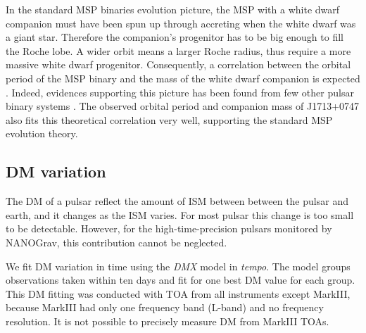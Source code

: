 In the standard MSP binaries evolution picture, the MSP with a white dwarf companion must have been spun up through
accreting when the white dwarf was a giant star. Therefore the 
companion's progenitor has to be big enough to fill the Roche lobe. A wider
orbit means a larger Roche radius, thus require a more massive white dwarf 
progenitor.
Consequently, a correlation between the orbital period
of the MSP binary and the mass of the white dwarf companion is expected \citep{rpj+95, ts99a, prp02b, th14}. 
Indeed, evidences supporting this picture has been found from few other pulsar
binary systems \citep{vbb+01, ktr94}.  
The observed  orbital period and companion mass of J1713+0747 also fits this theoretical correlation very well, supporting the standard MSP evolution theory. %




\subsection{DM variation}
\label{sec:dmx}
The DM of a pulsar reflect the amount of ISM between
between the pulsar and earth, and it changes as the ISM varies. For most pulsar
this change is too small to be detectable. However, for the
high-time-precision pulsars monitored by NANOGrav, this contribution cannot be 
neglected.

We fit DM variation in time using the {\it DMX} model in {\it tempo}.
The model groups observations taken within ten days and fit for one
best DM value for each group.   
This DM fitting was conducted with TOA from all instruments except MarkIII,
because MarkIII had only one frequency band (L-band) and no frequency
resolution. It is not possible to precisely measure DM from MarkIII TOAs.

